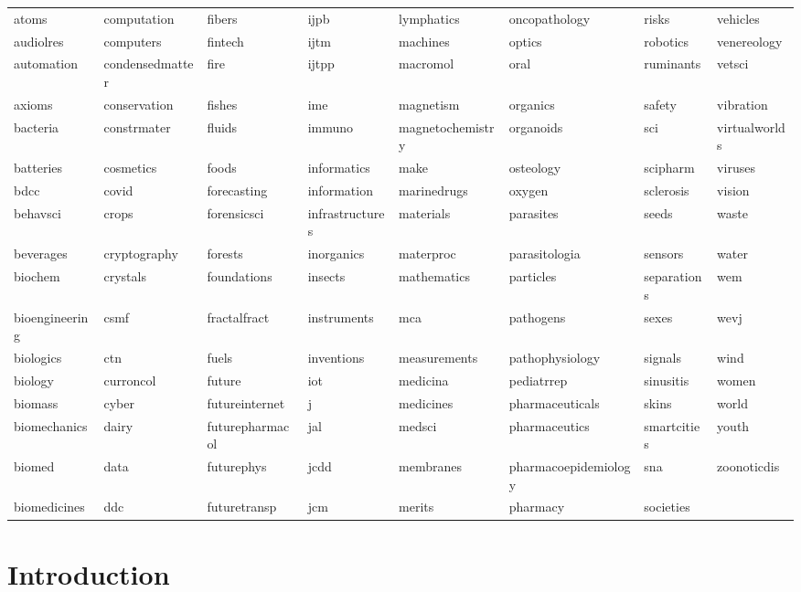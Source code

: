 \documentclass[notspecified,article,submit,moreauthors,pdftex]{Definitions/mdpi}
\begin{document}
\begin{longtable}[t]{llllllll}
atoms & computation & fibers & ijpb & lymphatics & oncopathology & risks & vehicles\\
\addlinespace
audiolres & computers & fintech & ijtm & machines & optics & robotics & venereology\\
automation & condensedmatter & fire & ijtpp & macromol & oral & ruminants & vetsci\\
axioms & conservation & fishes & ime & magnetism & organics & safety & vibration\\
bacteria & constrmater & fluids & immuno & magnetochemistry & organoids & sci & virtualworlds\\
batteries & cosmetics & foods & informatics & make & osteology & scipharm & viruses\\
\addlinespace
bdcc & covid & forecasting & information & marinedrugs & oxygen & sclerosis & vision\\
behavsci & crops & forensicsci & infrastructures & materials & parasites & seeds & waste\\
beverages & cryptography & forests & inorganics & materproc & parasitologia & sensors & water\\
biochem & crystals & foundations & insects & mathematics & particles & separations & wem\\
bioengineering & csmf & fractalfract & instruments & mca & pathogens & sexes & wevj\\
\addlinespace
biologics & ctn & fuels & inventions & measurements & pathophysiology & signals & wind\\
biology & curroncol & future & iot & medicina & pediatrrep & sinusitis & women\\
biomass & cyber & futureinternet & j & medicines & pharmaceuticals & skins & world\\
biomechanics & dairy & futurepharmacol & jal & medsci & pharmaceutics & smartcities & youth\\
biomed & data & futurephys & jcdd & membranes & pharmacoepidemiology & sna & zoonoticdis\\
\addlinespace
biomedicines & ddc & futuretransp & jcm & merits & pharmacy & societies & \\
\bottomrule
\end{longtable}
\finishlandscape

\section{Introduction}\label{introduction}
\end{document}
